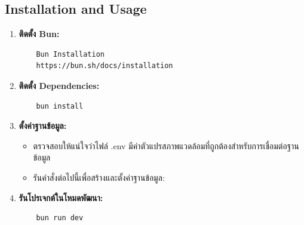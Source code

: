 \subsection{Installation and Usage}
\begin{enumerate}
    \item \textbf{ติดตั้ง Bun:}
    \begin{verbatim}
    Bun Installation 
    https://bun.sh/docs/installation
    \end{verbatim}
    \item \textbf{ติดตั้ง Dependencies:}
    \begin{verbatim}
    bun install
    \end{verbatim}
    \item \textbf{ตั้งค่าฐานข้อมูล:}
    \begin{itemize}
        \item ตรวจสอบให้แน่ใจว่าไฟล์ .env มีค่าตัวแปรสภาพแวดล้อมที่ถูกต้องสำหรับการเชื่อมต่อฐานข้อมูล
        \item รันคำสั่งต่อไปนี้เพื่อสร้างและตั้งค่าฐานข้อมูล:
    \end{itemize}
    \item \textbf{รันโปรเจกต์ในโหมดพัฒนา:}
    \begin{verbatim}
    bun run dev
    \end{verbatim}
\end{enumerate}
